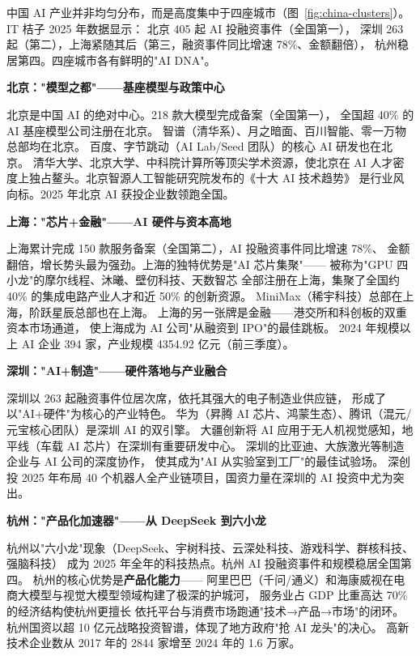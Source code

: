 中国 AI 产业并非均匀分布，而是高度集中于四座城市（图~\ref{fig:china-clusters}）。
IT 桔子 2025 年数据显示：
北京 405 起 AI 投融资事件（全国第一），
深圳 263 起（第二），上海紧随其后（第三，融资事件同比增速 78\%、金额翻倍），
杭州稳居第四。四座城市各有鲜明的"AI DNA"。

\begin{keybox}[北京 vs 上海 vs 深圳 vs 杭州：四城 AI DNA 对比]

\textbf{北京："模型之都"——基座模型与政策中心}

北京是中国 AI 的绝对中心。218 款大模型完成备案（全国第一），
全国超 40\% 的 AI 基座模型公司注册在北京。
智谱（清华系）、月之暗面、百川智能、零一万物总部均在北京。
百度、字节跳动（AI Lab/Seed 团队）的核心 AI 研发也在北京。
清华大学、北京大学、中科院计算所等顶尖学术资源，使北京在
AI 人才密度上独占鳌头。北京智源人工智能研究院发布的《十大 AI 技术趋势》
是行业风向标。2025 年北京 AI 获投企业数领跑全国。

\textbf{上海："芯片+金融"——AI 硬件与资本高地}

上海累计完成 150 款服务备案（全国第二），AI 投融资事件同比增速 78\%、
金额翻倍，增长势头最为强劲。上海的独特优势是"AI 芯片集聚"——
被称为"GPU 四小龙"的摩尔线程、沐曦、壁仞科技、天数智芯
全部注册在上海，集聚了全国约 40\% 的集成电路产业人才和近 50\% 的创新资源。
MiniMax（稀宇科技）总部在上海，阶跃星辰总部也在上海。
上海的另一张牌是金融——港交所和科创板的双重资本市场通道，
使上海成为 AI 公司"从融资到 IPO"的最佳跳板。
2024 年规模以上 AI 企业 394 家，产业规模 4354.92 亿元（前三季度）。

\textbf{深圳："AI+制造"——硬件落地与产业融合}

深圳以 263 起融资事件位居次席，依托其强大的电子制造业供应链，
形成了以"AI+硬件"为核心的产业特色。
华为（昇腾 AI 芯片、鸿蒙生态）、腾讯（混元/元宝核心团队）是深圳 AI 的双引擎。
大疆创新将 AI 应用于无人机视觉感知，地平线（车载 AI 芯片）在深圳有重要研发中心。
深圳的比亚迪、大族激光等制造企业与 AI 公司的深度协作，
使其成为"AI 从实验室到工厂"的最佳试验场。
深创投 2025 年布局 40 个机器人全产业链项目，国资力量在深圳的 AI 投资中尤为突出。

\textbf{杭州："产品化加速器"——从 DeepSeek 到六小龙}

杭州以"六小龙"现象（DeepSeek、宇树科技、云深处科技、游戏科学、群核科技、强脑科技）
成为 2025 年全年的科技热点。杭州 AI 投融资事件和规模稳居全国第四。
杭州的核心优势是\textbf{产品化能力}——
阿里巴巴（千问/通义）和海康威视在电商大模型与视觉大模型领域构建了极深的护城河，
服务业占 GDP 比重高达 70\% 的经济结构使杭州更擅长
依托平台与消费市场跑通"技术→产品→市场"的闭环。
杭州国资以超 10 亿元战略投资智谱，体现了地方政府"抢 AI 龙头"的决心。
高新技术企业数从 2017 年的 2844 家增至 2024 年的 1.6 万家。
\end{keybox}

